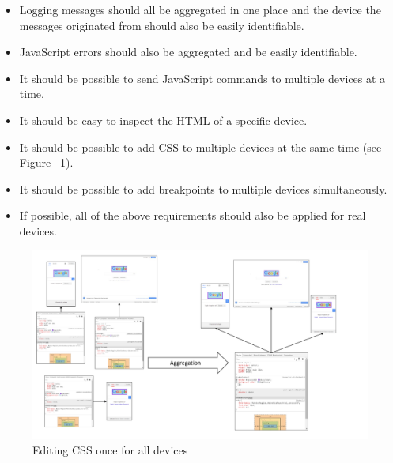 \begin{itemize}
	\item Logging messages should all be aggregated in one place and the device the messages originated from should also be easily identifiable.
	\item JavaScript errors should also be aggregated and be easily identifiable.
	\item It should be possible to send JavaScript commands to multiple devices at a time. 
	\item It should be easy to inspect the HTML of a specific device.
	\item It should be possible to add CSS to multiple devices at the same time (see Figure ~\ref{fig:css_aggregation}).
	\item It should be possible to add breakpoints to multiple devices simultaneously.
	\item If possible, all of the above requirements should also be applied for real devices.
\end{itemize}

\begin{figure}[H]
  \centering
    \includegraphics[width=1.0\textwidth]{images/css_aggregation.pdf}
	\caption{Editing CSS once for all devices}
	\label{fig:css_aggregation}
\end{figure}

